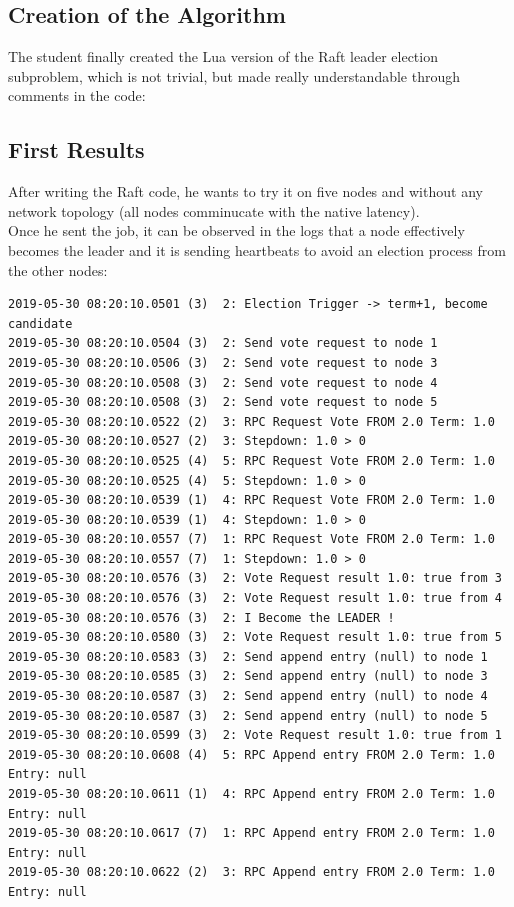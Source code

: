\documentclass{eplmastersthesis}
\begin{document}
      \subsection{Creation of the Algorithm}

        The student finally created the Lua version of the Raft leader
        election subproblem, which is not trivial, but made really
        understandable through comments in the code:

        

      \subsection{First Results}

        After writing the Raft code, he wants to try it on five nodes
        and without any network topology (all nodes comminucate with the native latency).\\
        Once he sent the job, it can be observed in the logs that a node
        effectively becomes the leader and it is sending heartbeats to avoid
        an election process from the other nodes:

        \begin{lstlisting}[style=MyBash]
2019-05-30 08:20:10.0501 (3)  2: Election Trigger -> term+1, become candidate
2019-05-30 08:20:10.0504 (3)  2: Send vote request to node 1
2019-05-30 08:20:10.0506 (3)  2: Send vote request to node 3
2019-05-30 08:20:10.0508 (3)  2: Send vote request to node 4
2019-05-30 08:20:10.0508 (3)  2: Send vote request to node 5
2019-05-30 08:20:10.0522 (2)  3: RPC Request Vote FROM 2.0 Term: 1.0
2019-05-30 08:20:10.0527 (2)  3: Stepdown: 1.0 > 0
2019-05-30 08:20:10.0525 (4)  5: RPC Request Vote FROM 2.0 Term: 1.0
2019-05-30 08:20:10.0525 (4)  5: Stepdown: 1.0 > 0
2019-05-30 08:20:10.0539 (1)  4: RPC Request Vote FROM 2.0 Term: 1.0
2019-05-30 08:20:10.0539 (1)  4: Stepdown: 1.0 > 0
2019-05-30 08:20:10.0557 (7)  1: RPC Request Vote FROM 2.0 Term: 1.0
2019-05-30 08:20:10.0557 (7)  1: Stepdown: 1.0 > 0
2019-05-30 08:20:10.0576 (3)  2: Vote Request result 1.0: true from 3
2019-05-30 08:20:10.0576 (3)  2: Vote Request result 1.0: true from 4
2019-05-30 08:20:10.0576 (3)  2: I Become the LEADER !
2019-05-30 08:20:10.0580 (3)  2: Vote Request result 1.0: true from 5
2019-05-30 08:20:10.0583 (3)  2: Send append entry (null) to node 1
2019-05-30 08:20:10.0585 (3)  2: Send append entry (null) to node 3
2019-05-30 08:20:10.0587 (3)  2: Send append entry (null) to node 4
2019-05-30 08:20:10.0587 (3)  2: Send append entry (null) to node 5
2019-05-30 08:20:10.0599 (3)  2: Vote Request result 1.0: true from 1
2019-05-30 08:20:10.0608 (4)  5: RPC Append entry FROM 2.0 Term: 1.0 Entry: null
2019-05-30 08:20:10.0611 (1)  4: RPC Append entry FROM 2.0 Term: 1.0 Entry: null
2019-05-30 08:20:10.0617 (7)  1: RPC Append entry FROM 2.0 Term: 1.0 Entry: null
2019-05-30 08:20:10.0622 (2)  3: RPC Append entry FROM 2.0 Term: 1.0 Entry: null
        \end{lstlisting}
\end{document}

